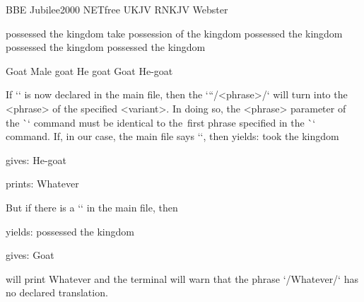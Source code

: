 \begtt
{} {BBE} {Jubilee2000} {NETfree} {UKJV} {RNKJV} {Webster} 

      {possessed the kingdom} %
      {take possession of the kingdom} %
      {possessed the kingdom} %
      {possessed the kingdom} %
      {possessed the kingdom} %
      
      {Goat} %
      {Male goat} %
      {He goat} %
      {Goat} %
      {He-goat} %

\endtt

If `\def\tmark {<variant>}` is now declared in the main file,
then the `\x``/<phrase>/` will turn into the <phrase> of the specified <variant>.
In doing so, the <phrase> parameter of the \`\x` command must be identical to the~first phrase 
specified in the \`\vdef` command. If, in our case, the main file says `\def\tmark{BBE}`, then
\medskip
{} yields: took the kingdom 

 gives: He-goat

 prints: Whatever

\medskip

But if there is a `\def\tmark{Jubilee2000}` in the main file, then

\medskip
{} yields: possessed the kingdom 

 gives: Goat

  will print Whatever and the terminal will warn
                                  that the phrase `/Whatever/` has no declared translation.
\medskip




%

